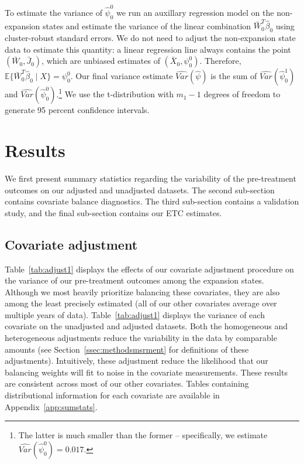 \documentclass[aoas]{imsart}
\theoremstyle{plain}
\theoremstyle{remark}
\begin{document}
To estimate the variance of $\hat{\psi}_0^0$ we run an auxillary regression model on the non-expansion states and estimate the variance of the linear combination $\bar{W}_0^T\hat{\beta}_0$ using cluster-robust standard errors. We do not need to adjust the non-expansion state data to estimate this quantity: a linear regression line always contains the point $(\bar{W}_0, \bar{J}_0)$, which are unbiased estimates of $(\bar{X}_0, \psi_0^0)$. Therefore, $\mathbb{E}\{\bar{W}_0^T\hat{\beta}_0 \mid X\} = \psi_0^0$. Our final variance estimate $\hat{Var}(\hat{\psi})$ is the sum of $\hat{Var}(\hat{\psi}_0^1)$ and $\hat{Var}(\hat{\psi}_0^0)$.\footnote{The latter is much smaller than the former -- specifically, we estimate $\hat{Var}(\hat{\psi}_0^0) = 0.017$.} We use the t-distribution with $m_1 - 1$ degrees of freedom to generate 95 percent confidence intervals.

\section{Results}\label{sec:results}

We first present summary statistics regarding the variability of the pre-treatment outcomes on our adjusted and unadjusted datasets. The second sub-section contains covariate balance diagnostics. The third sub-section contains a validation study, and the final sub-section contains our ETC estimates.

\subsection{Covariate adjustment}

Table~\ref{tab:adjust1} displays the effects of our covariate adjustment procedure on the variance of our pre-treatment outcomes among the expansion states. Although we most heavily prioritize balancing these covariates, they are also among the least precisely estimated (all of our other covariates average over multiple years of data). Table~\ref{tab:adjust1} displays the variance of each covariate on the unadjusted and adjusted datasets. Both the homogeneous and heterogeneous adjustments reduce the variability in the data by comparable amounts (see Section~\ref{ssec:methodsmsrment} for definitions of these adjustments). Intuitively, these adjustment reduce the likelihood that our balancing weights will fit to noise in the covariate measurements. These results are consistent across most of our other covariates. Tables containing distributional information for each covariate are available in Appendix~\ref{app:sumstats}. 
\end{document}
